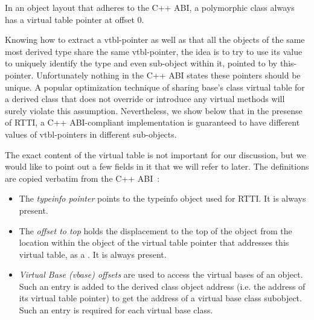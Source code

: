 \begin{lemma}
In an object layout that adheres to the C++ ABI, a polymorphic class always has a 
virtual table pointer at offset 0.
\label{lem:vtbl}
\end{lemma}

\noindent
Knowing how to extract a vtbl-pointer as well as that all the objects of the 
same most derived type share the same vtbl-pointer, the idea is to try to use 
its value to uniquely identify the type and even sub-object within it, pointed 
to by this-pointer. Unfortunately nothing in the C++ ABI states these pointers 
should be unique. A popular optimization technique of sharing base's class 
virtual table for a derived class that does not override or introduce any virtual methods 
will surely violate this assumption. Nevertheless, we show below that in the 
presense of RTTI, a C++ ABI-compliant implementation is guaranteed to have 
different values of vtbl-pointers in different sub-objects.



The exact content of the virtual table is not important for our discussion, but 
we would like to point out a few fields in it that we will refer to later. The 
definitions are copied verbatim from the C++ ABI~\cite[.2]{C++ABI}:

\begin{itemize}
\setlength{\itemsep}{0pt}
\setlength{\parskip}{0pt}
\item The \emph{typeinfo pointer} points to the typeinfo object used for RTTI. 
      It is always present.  
\item The \emph{offset to top} holds the displacement to the top of the object 
      from the location within the object of the virtual table pointer that 
      addresses this virtual table, as a . It is always present.
\item \emph{Virtual Base (vbase) offsets} are used to access the virtual bases 
      of an object. Such an entry is added to the derived class object address 
      (i.e. the address of its virtual table pointer) to get the address of a 
      virtual base class subobject. Such an entry is required for each virtual 
      base class.
\end{itemize}

